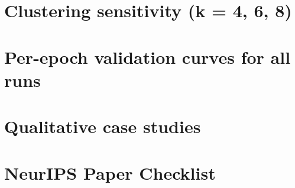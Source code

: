 \section{Clustering sensitivity (k = 4, 6, 8)}
\section{Per-epoch validation curves for all runs}
\section{Qualitative case studies}
\section{NeurIPS Paper Checklist}


